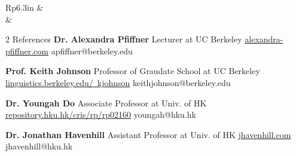\documentclass[letterpaper, 11pt]{article}
\newcommand{\headingfont}{\Large\color{MidnightBlue}}
\newenvironment{SectionTable}[1]{
	\renewcommand*{\arraystretch}{1.7}
	\setlength{\tabcolsep}{10pt}
	\begin{longtable}{Rp{6.3in}} & #1 \\}
{\end{longtable}\vspace{-.3cm}}
\begin{document}
\begin{SectionTable}{}
	& \begin{multicols*}{2}
		{\headingfont References}\vspace{0.5cm}\newline
		\textbf{Dr. Alexandra Pfiffner}\newline
		Lecturer at UC Berkeley\newline
		\href{https://www.alexandra-pfiffner.com/}{alexandra-pfiffner.com}\newline
		apfiffner@berkeley.edu\newline

		\textbf{Prof. Keith Johnson}\newline
		Professor of Graudate School at UC Berkeley\newline
		\href{https://linguistics.berkeley.edu/~kjohnson/}{linguistics.berkeley.edu/~kjohnson}\newline
		keithjohnson@berkeley.edu\newline

		



		\vspace{0.5cm}\textbf{Dr. Youngah Do}\newline
		Associate Professor at Univ. of HK\newline
		\href{https://repository.hku.hk/cris/rp/rp02160}{repository.hku.hk/cris/rp/rp02160}\newline
		youngah@hku.hk\newline

		\textbf{Dr. Jonathan Havenhill}\newline
		Assistant Professor at Univ. of HK\newline
		\href{https://jhavenhill.com}{jhavenhill.com}\newline
		jhavenhill@hku.hk
	\end{multicols*}
\end{SectionTable}
\end{document}
